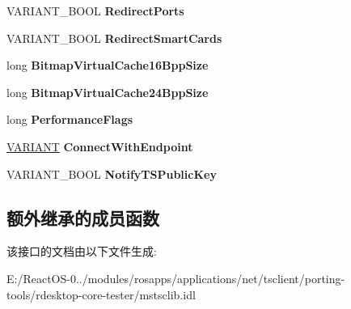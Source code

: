 \begin{DoxyCompactItemize}
\item 
\mbox{\label{interface_m_s_t_s_c_lib_1_1_i_ms_rdp_client_advanced_settings_af1120c7ceee00b0f40c6186c80f86dea}} 
V\+A\+R\+I\+A\+N\+T\+\_\+\+B\+O\+OL {\bfseries Redirect\+Ports}
\item 
\mbox{\label{interface_m_s_t_s_c_lib_1_1_i_ms_rdp_client_advanced_settings_a34d20154c164a7ffabda24a50271130d}} 
V\+A\+R\+I\+A\+N\+T\+\_\+\+B\+O\+OL {\bfseries Redirect\+Smart\+Cards}
\item 
\mbox{\label{interface_m_s_t_s_c_lib_1_1_i_ms_rdp_client_advanced_settings_a8330debe2a17239e0513c9e9a8fd318d}} 
long {\bfseries Bitmap\+Virtual\+Cache16\+Bpp\+Size}
\item 
\mbox{\label{interface_m_s_t_s_c_lib_1_1_i_ms_rdp_client_advanced_settings_a6b260875d7e4aedf4d6fcc1ac8a9d518}} 
long {\bfseries Bitmap\+Virtual\+Cache24\+Bpp\+Size}
\item 
\mbox{\label{interface_m_s_t_s_c_lib_1_1_i_ms_rdp_client_advanced_settings_ad4b69ca054022dad55789cd82ed0dafb}} 
long {\bfseries Performance\+Flags}
\item 
\mbox{\label{interface_m_s_t_s_c_lib_1_1_i_ms_rdp_client_advanced_settings_af91c8367620f82704232684782b1407a}} 
\hyperlink{structtag_v_a_r_i_a_n_t}{V\+A\+R\+I\+A\+NT} {\bfseries Connect\+With\+Endpoint}
\item 
\mbox{\label{interface_m_s_t_s_c_lib_1_1_i_ms_rdp_client_advanced_settings_afbccc43d0e8b027b15a92508d8e34b50}} 
V\+A\+R\+I\+A\+N\+T\+\_\+\+B\+O\+OL {\bfseries Notify\+T\+S\+Public\+Key}
\end{DoxyCompactItemize}
\subsection*{额外继承的成员函数}


该接口的文档由以下文件生成\+:\begin{DoxyCompactItemize}
\item 
E\+:/\+React\+O\+S-\/0../modules/rosapps/applications/net/tsclient/porting-\/tools/rdesktop-\/core-\/tester/mstsclib.\+idl\end{DoxyCompactItemize}
